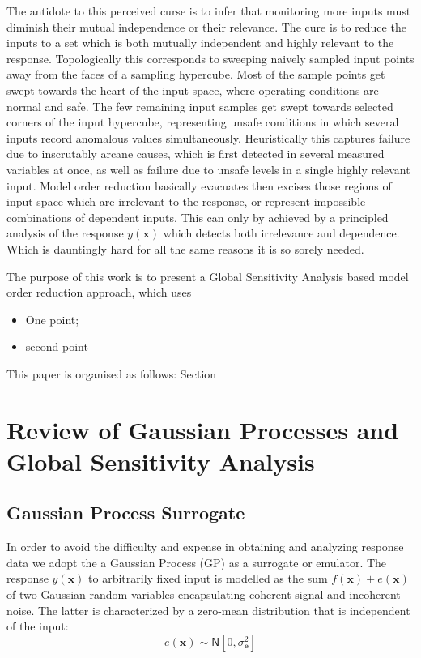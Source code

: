 \documentclass[preprint,12pt]{elsarticle}
\newcommand*{\M}[1]{\ensuremath{#1}\xspace}
\newcommand*{\vr}[1]{\M{\mathbf{#1}}}
\newcommand*{\gauss}[2]{\mathsf{N}\!\left\lbrack{} #1 , #2 \right\rbrack}
\begin{document}
        The antidote to this perceived curse is to infer that monitoring more inputs must diminish their mutual independence or their relevance. The cure is to reduce the inputs to a set which is both mutually independent and highly relevant to the response. Topologically this corresponds to sweeping naively sampled input points away from the faces of a sampling hypercube. Most of the sample points get swept towards the heart of the input space, where operating conditions are normal and safe. The few remaining input samples get swept towards selected corners of the input hypercube, representing unsafe conditions in which several inputs record anomalous values simultaneously. Heuristically this captures failure due to inscrutably arcane causes, which is first detected in several measured variables at once, as well as failure due to unsafe levels in a single highly relevant input. Model order reduction basically evacuates then excises those regions of input space which are irrelevant to the response, or represent impossible combinations of dependent inputs. This can only by achieved by a principled analysis of the response $y(\vr{x})$ which detects both irrelevance and dependence. Which is dauntingly hard for all the same reasons it is so sorely needed.

The purpose of this work is to present a Global Sensitivity Analysis based model order reduction approach, which uses 
\begin{itemize}
\item One point; \\
\item second point \\
\end{itemize}

This paper is organised as follows: Section 

\section{Review of Gaussian Processes and Global Sensitivity Analysis} \label{sec:TheoryReview}
   \subsection{Gaussian Process Surrogate}
            In order to avoid the difficulty and expense in obtaining and analyzing response data we adopt the a Gaussian Process (GP) as a surrogate or emulator. The response $y(\vr{x})$ to arbitrarily fixed input is modelled as the sum $f(\vr{x})+e(\vr{x})$ of two Gaussian random variables encapsulating coherent signal and incoherent noise. The latter is characterized by a zero-mean distribution that is independent of the input:
            \begin{equation*}
                e(\vr{x}) \sim \gauss{0}{\sigma^{2}_\vr{e}}
            \end{equation*}
\end{document}
